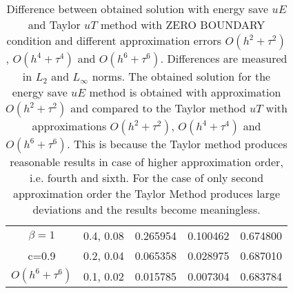 \documentclass{article}
\begin{document}
\begin{table}[ht]
\begin{tabular}{||c|l|l|l|l||}
    \hline
  $\beta=1$                   & 0.4, 0.08        & 0.265954  & 0.100462  & 0.674800 \\
      c=0.9                       & 0.2, 0.04        & 0.065358   & 0.028975  &0.687010   \\
     $O(h^6+ \tau^6)$   & 0.1, 0.02    & 0.015785   & 0.007304    & 0.683784   \\
	   \hline
			\hline 
		\end{tabular}
		\caption{Difference between obtained solution with energy save $uE$ and Taylor $uT$ method with ZERO BOUNDARY condition and different approximation errors $O(h^{2} + \tau^2 )$, $O(h^{4} + \tau^4 )$ and $O(h^{6} + \tau^6 )$. Differences are measured in $L_2$ and $L_\infty$ norms. The obtained solution for the energy save $uE$ method is obtained with approximation $O(h^2+ \tau^2)$ and compared to the Taylor method $uT$ with approximations $O(h^{2} + \tau^2 )$, $O(h^{4} + \tau^4 )$ and $O(h^{6} + \tau^6 )$. This is because the Taylor method produces reasonable results in case of  higher approximation order, i.e. fourth and sixth. For the case of only second approximation order the Taylor Method produces large deviations and the results become meaningless.}
\label{tableE}
\end{table}
\end{document}
